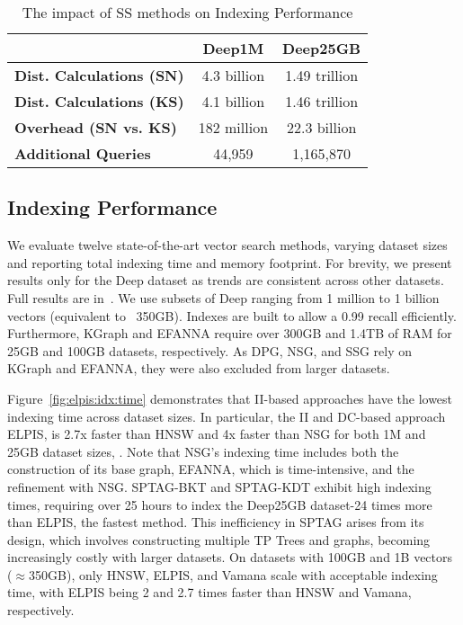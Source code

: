 \begin{table}[tb]
\centering
\begin{tabular}{@{}lcc@{}}
\toprule
& \textbf{Deep1M} & \textbf{Deep25GB} \\ 
\midrule
\textbf{Dist. Calculations (SN)} & 4.3 billion & 1.49 trillion \\
\textbf{Dist. Calculations (KS)} & 4.1 billion & 1.46 trillion \\
\midrule
\textbf{Overhead (SN vs. KS)} & 182 million & 22.3 billion \\
\textbf{Additional Queries} & 44,959 & 1,165,870 \\
\bottomrule
\end{tabular}
\caption{The impact of SS methods on Indexing Performance}
\label{tab:ss:idx}
\end{table}


\subsection{Indexing Performance}
We evaluate twelve state-of-the-art vector search methods, varying dataset sizes and reporting total indexing time and memory footprint. For brevity, we present results only for the Deep dataset as trends are consistent across other datasets. Full results are in~\cite{url/GASS}.  We use subsets of Deep ranging from 1 million to 1 billion vectors (equivalent to ~350GB). Indexes are built to allow a 0.99 recall efficiently.  Furthermore, KGraph and EFANNA require over 300GB and 1.4TB of RAM for 25GB and 100GB datasets, respectively. As DPG, NSG, and SSG rely on KGraph and EFANNA, they were also excluded from larger datasets.

 Figure~\ref{fig:elpis:idx:time} demonstrates that II-based approaches have the lowest indexing time across dataset sizes. In particular, the II and DC-based approach ELPIS, is 2.7x faster than HNSW and 4x faster than NSG for both 1M and 25GB dataset sizes, . Note that NSG's indexing time includes both the construction of its base graph, EFANNA, which is time-intensive, and the refinement with NSG. SPTAG-BKT and SPTAG-KDT exhibit high indexing times, requiring over 25 hours to index the Deep25GB dataset-24 times more than ELPIS, the fastest method. This inefficiency in SPTAG arises from its design, which involves constructing multiple TP Trees and graphs, becoming increasingly costly with larger datasets. On datasets with 100GB and 1B vectors ($\approx$350GB), only HNSW, ELPIS, and Vamana scale with acceptable indexing time, with ELPIS being 2 and 2.7 times faster than HNSW and Vamana, respectively.


